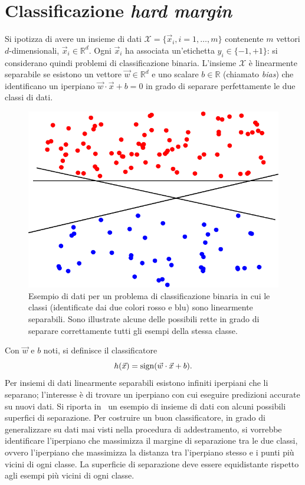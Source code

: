 \section{Classificazione \emph{hard margin}}\label{sec:hard_margin_classifier}
Si ipotizza di avere un insieme di dati $\mathcal{X} = \{\Vec{x}_i, i=1,\dots,m\}$ contenente $m$ vettori $d$-dimensionali, $\Vec{x}_i \in \mathbb{R}^d$. 
Ogni $\Vec{x}_i$ ha associata un'etichetta $y_i \in \{-1, +1\}$: si considerano quindi problemi di classificazione binaria.
%
L'insieme $\mathcal{X}$ è linearmente separabile se esistono un vettore $\Vec{w} \in \mathbb{R}^d$ e uno scalare $b \in \mathbb{R}$ (chiamato \emph{bias}) che identificano un iperpiano $\Vec{w}\cdot \Vec{x} +b=0$ in grado di separare perfettamente le due classi di dati.
\begin{figure}
    \centering
    \includegraphics[width=0.5\linewidth]{img/dati_linearmente_separabili.pdf}
    \caption{Esempio di dati per un problema di classificazione binaria in cui le classi (identificate dai due colori rosso e blu) sono linearmente separabili. Sono illustrate alcune delle possibili rette in grado di separare correttamente tutti gli esempi della stessa classe. }
    \label{fig:dati_linearmente_separabili}
\end{figure}
Con $\Vec{w}$ e $b$ noti, si definisce il classificatore 
\begin{equation*}
    h(\Vec{x}) = \mathrm{sign}(\Vec{w}\cdot \Vec{x} +b).
\end{equation*} 
Per insiemi di dati linearmente separabili esistono infiniti iperpiani che li separano; l'interesse è di trovare un iperpiano con cui eseguire predizioni accurate su nuovi dati. 
Si riporta in~ un esempio di insieme di dati con alcuni possibili superfici di separazione. 
Per costruire un buon classificatore, in grado di generalizzare su dati mai visti nella procedura di addestramento, si vorrebbe identificare l'iperpiano che massimizza il margine di separazione tra le due classi, ovvero l'iperpiano che massimizza la distanza tra l'iperpiano stesso e i punti più vicini di ogni classe.
La superficie di separazione deve essere equidistante rispetto agli esempi più vicini di ogni classe.

